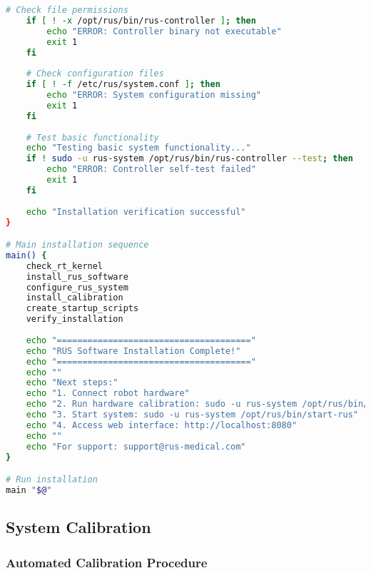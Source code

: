 \begin{lstlisting}[language=bash, caption={RUS Software Installation Script}, label={lst:app-software-install}]
    # Check file permissions
    if [ ! -x /opt/rus/bin/rus-controller ]; then
        echo "ERROR: Controller binary not executable"
        exit 1
    fi
    
    # Check configuration files
    if [ ! -f /etc/rus/system.conf ]; then
        echo "ERROR: System configuration missing"
        exit 1
    fi
    
    # Test basic functionality
    echo "Testing basic system functionality..."
    if ! sudo -u rus-system /opt/rus/bin/rus-controller --test; then
        echo "ERROR: Controller self-test failed"
        exit 1
    fi
    
    echo "Installation verification successful"
}

# Main installation sequence
main() {
    check_rt_kernel
    install_rus_software
    configure_rus_system
    install_calibration
    create_startup_scripts
    verify_installation
    
    echo "======================================"
    echo "RUS Software Installation Complete!"
    echo "======================================"
    echo ""
    echo "Next steps:"
    echo "1. Connect robot hardware"
    echo "2. Run hardware calibration: sudo -u rus-system /opt/rus/bin/rus-calibrate"
    echo "3. Start system: sudo -u rus-system /opt/rus/bin/start-rus"
    echo "4. Access web interface: http://localhost:8080"
    echo ""
    echo "For support: support@rus-medical.com"
}

# Run installation
main "$@"
\end{lstlisting}

\subsection{System Calibration}

\subsubsection{Automated Calibration Procedure}

